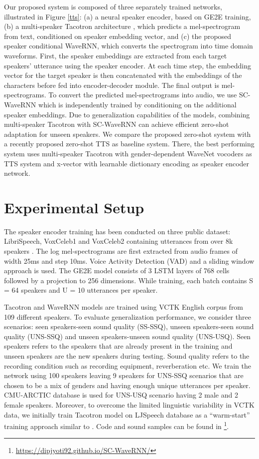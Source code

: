 \documentclass[a4paper]{article}
\begin{document}
Our proposed system is composed of three separately trained networks, illustrated in Figure \ref{tts}: (a) a neural speaker encoder, based on GE2E training, (b) a multi-speaker Tacotron  architecture \cite{wang2017tacotron}, which predicts a mel-spectrogram from text, conditioned on speaker embedding vector, and (c) the proposed speaker conditional WaveRNN, which converts the spectrogram into time domain waveforms. First, the speaker embeddings are extracted from each target speakers' utterance using the speaker encoder. At each time step, the embedding vector for the target speaker is then concatenated with the embeddings of the characters before fed into encoder-decoder module. The final output is mel-spectrograms. To convert the predicted mel-spectrograms into audio, we use SC-WaveRNN which is independently trained by conditioning on the additional speaker embeddings. Due to generalization capabilities of the models, combining multi-speaker Tacotron with SC-WaveRNN can achieve efficient zero-shot adaptation for unseen speakers. We compare the proposed zero-shot system with a recently proposed zero-shot TTS \cite{cooper2019zero} as baseline system. There, the best performing system uses multi-speaker Tacotron with gender-dependent WaveNet vocoders as TTS system and x-vector with learnable dictionary
encoding as speaker encoder network.

\vspace{-3mm}
\section{Experimental Setup}
The speaker encoder training has been conducted on three public dataset: LibriSpeech, VoxCeleb1 and VoxCeleb2 containing utterances from over 8k speakers \cite{jia2018transfer}. The log mel-spectrograms are first extracted from audio frames of width 25ms and step 10ms. Voice Activity Detection (VAD) and a
sliding window approach is used. The GE2E model consists of 3 LSTM layers of 768 cells followed by a projection to 256 dimensions. While training, each batch contains S = 64 speakers and U = 10 utterances per speaker.


Tacotron and WaveRNN models are trained using VCTK English corpus \cite{christophe2016cstr} from 109 different speakers. To evaluate generalization performance, we consider three scenarios: seen speakers-seen sound quality (SS-SSQ), unseen speakers-seen sound quality (UNS-SSQ) and unseen speakers-unseen sound quality (UNS-USQ). Seen speakers refers to the speakers that are already present in the training and unseen speakers are the new speakers during testing. Sound quality refers to the recording condition such as recording equipment, reverberation etc. We train the network using 100 speakers leaving 9 speakers for UNS-SSQ scenarios that are chosen to be a mix of genders and having enough unique utterances per speaker. CMU-ARCTIC database \cite{kominek2004cmu} is used for UNS-USQ scenario having 2 male and 2 female speakers. Moreover, to overcome the limited linguistic variability in VCTK data, we initially train Tacotron model on LJSpeech database as a ``warm-start'' training approach similar to \cite{cooper2019zero}. Code and sound samples can be found in \footnote{\url{https://dipjyoti92.github.io/SC-WaveRNN/}}.
\vspace{-2mm}
\end{document}
